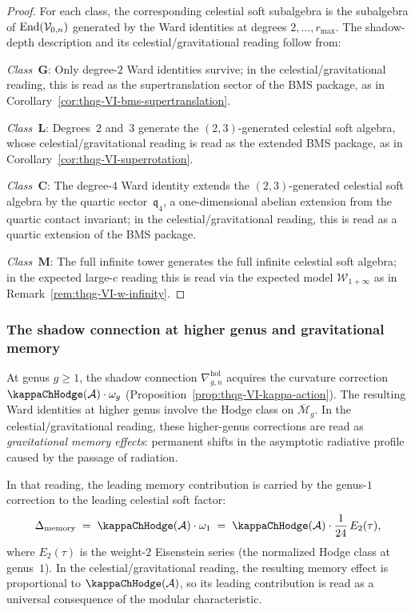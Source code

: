 \begin{proof}
For each class, the corresponding celestial soft subalgebra is the
subalgebra
of $\operatorname{End}(\mathcal{V}_{0,n})$ generated by the Ward identities at degrees
$2, \dotsc, r_{\max}$. The shadow-depth description and its
celestial/gravitational reading follow from:

\emph{Class~$\mathbf{G}$}: Only degree-$2$ Ward identities
survive; in the celestial/gravitational reading, this is read as the
supertranslation sector of the BMS package, as in
Corollary~\ref{cor:thqg-VI-bms-supertranslation}.

\emph{Class~$\mathbf{L}$}: Degrees~$2$ and~$3$ generate
the $(2,3)$-generated celestial soft algebra, whose
celestial/gravitational reading is read as the extended
BMS package, as in
Corollary~\ref{cor:thqg-VI-superrotation}.

\emph{Class~$\mathbf{C}$}: The degree-$4$ Ward identity extends
the $(2,3)$-generated celestial soft algebra by the quartic
sector~$\mathfrak{q}_4$, a one-dimensional abelian extension from
the quartic contact invariant; in the celestial/gravitational
reading, this is read as a quartic extension of the BMS package.

\emph{Class~$\mathbf{M}$}: The full infinite tower generates
the full infinite celestial soft algebra; in the expected large-$c$
reading this is read via the expected model $\mathcal{W}_{1+\infty}$ as in
Remark~\ref{rem:thqg-VI-w-infinity}.
\end{proof}

\subsubsection{The shadow connection at higher genus and
gravitational memory}

\begin{remark}
At genus $g \geq 1$, the shadow connection
$\nabla^{\mathrm{hol}}_{g,n}$ acquires the curvature correction
$\kappaChHodge(\cA) \cdot \omega_g$
(Proposition~\ref{prop:thqg-VI-kappa-action}). The resulting
Ward identities at higher genus involve the Hodge class on
$\overline{\mathcal{M}}_g$. In the celestial/gravitational reading,
these higher-genus corrections are read as \emph{gravitational memory
effects}: permanent shifts in the asymptotic radiative profile caused
by the passage of radiation.

In that reading, the leading memory contribution is carried by the
genus-$1$ correction to the leading celestial soft factor:
\begin{equation}%
\Delta_{\mathrm{memory}}
\;=\;
\kappaChHodge(\cA) \cdot \omega_1
\;=\;
\kappaChHodge(\cA) \cdot \frac{1}{24}\,E_2(\tau),
\end{equation}
where $E_2(\tau)$ is the weight-$2$ Eisenstein series (the
normalized Hodge class at genus~$1$). In the
celestial/gravitational reading, the resulting memory effect is
proportional to $\kappaChHodge(\cA)$, so its leading contribution is
read as a universal consequence of the modular characteristic.
\end{remark}

